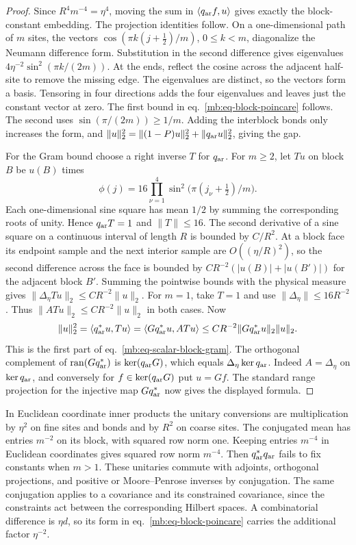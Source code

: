 \documentclass[11pt,letterpaper,reqno]{amsart}
\numberwithin{equation}{section}
\renewcommand{\eqref}[1]{\textup{eq.~\ref{#1}}}
\theoremstyle{definition}
\theoremstyle{remark}
\begin{document}
\begin{proof}
Since \(R^4m^{-4}=\eta^4\), moving the sum in
\(\langle q_{\rm ar} f,u\rangle\) gives exactly the block-constant
embedding. The projection identities follow.
On a one-dimensional path of \(m\) sites, the vectors
\(\cos(\pi k(j+\tfrac12)/m)\), \(0\le k<m\), diagonalize the
Neumann difference form. Substitution in the second difference
gives eigenvalues \(4\eta^{-2}\sin^2(\pi k/(2m))\). At the ends,
reflect the cosine across the adjacent half-site to remove
the missing edge. The eigenvalues are distinct, so the vectors
form a basis. Tensoring in four directions adds the four
eigenvalues and leaves just the constant vector at zero.
The first bound in \eqref{mb:eq-block-poincare} follows.
The second uses \(\sin(\pi/(2m))\ge1/m\).
Adding the interblock bonds only increases the form, and
\(\|u\|_2^2=\|(1-P)u\|_2^2+\|q_{\rm ar}u\|_2^2\), giving the gap.

For the Gram bound choose a right inverse \(T\) for \(q_{\rm ar}\).
For \(m\ge2\), let \(Tu\) on block \(B\) be \(u(B)\) times
\[
 \phi(j)=16\prod_{\nu=1}^4
                     \sin^2\!\bigl(\pi(j_\nu+\tfrac12)/m\bigr).
\]
Each one-dimensional sine square has mean \(1/2\) by summing
the corresponding roots of unity. Hence \(q_{\rm ar}T=1\) and
\(\|T\|\le16\). The second derivative of a sine square on
a continuous interval of length \(R\) is bounded by \(C/R^2\).
At a block face its endpoint sample and the next interior sample
are \(O((\eta/R)^2)\), so the second difference across the face
is bounded by \(CR^{-2}(|u(B)|+|u(B')|)\) for the adjacent block
\(B'\). Summing the pointwise bounds with the physical measure
gives \(\|\Delta_\eta Tu\|_2\le CR^{-2}\|u\|_2\).
For \(m=1\), take \(T=1\) and use \(\|\Delta_\eta\|\le16R^{-2}\).
Thus \(\|ATu\|_2\le CR^{-2}\|u\|_2\) in both cases. Now
\[
 \|u\|_2^2=\langle q_{\rm ar}^*u,Tu\rangle
                  =\langle Gq_{\rm ar}^*u,ATu\rangle
                  \le CR^{-2}\|Gq_{\rm ar}^*u\|_2\|u\|_2 .
\]
This is the first part of \eqref{mb:eq-scalar-block-gram}.
The orthogonal complement of \(\operatorname{ran}(Gq_{\rm ar}^*)\)
is \(\ker(q_{\rm ar}G)\), which equals \(\Delta_\eta\ker q_{\rm ar}\).
Indeed \(A=\Delta_\eta\) on \(\ker q_{\rm ar}\), and conversely for
\(f\in\ker(q_{\rm ar}G)\) put \(u=Gf\). The standard range projection
for the injective map \(Gq_{\rm ar}^*\) now gives the displayed formula.
\end{proof}

In Euclidean coordinate inner products the unitary conversions
are multiplication by \(\eta^2\) on fine sites and bonds and by
\(R^2\) on coarse sites. The conjugated mean has entries \(m^{-2}\)
on its block, with squared row norm one. Keeping entries
\(m^{-4}\) in Euclidean coordinates gives squared row norm
\(m^{-4}\). Then \(q_{\rm ar}^*q_{\rm ar}\) fails to fix constants
when \(m>1\). These unitaries commute with adjoints, orthogonal
projections, and positive or Moore--Penrose inverses by conjugation.
The same conjugation applies to a covariance and its constrained
covariance, since the constraints act between the corresponding
Hilbert spaces. A combinatorial difference is \(\eta d\),
so its form in \eqref{mb:eq-block-poincare} carries the
additional factor \(\eta^{-2}\).
\end{document}
